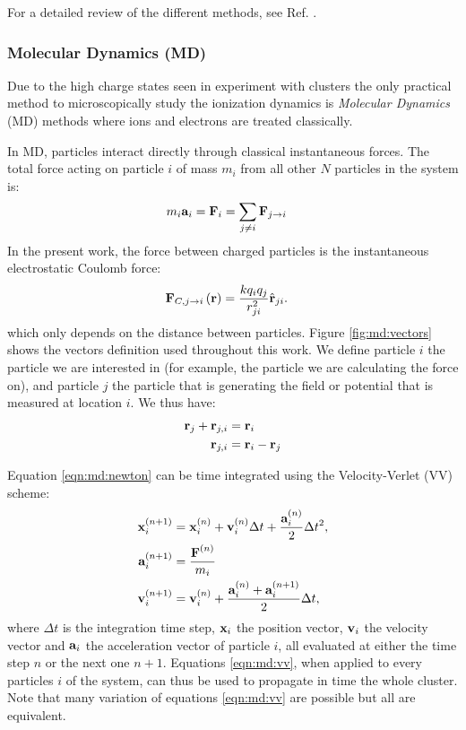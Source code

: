 For a detailed review of the different methods, see Ref. \cite{Fennel2010}.



\subsubsection{Molecular Dynamics (MD)}
Due to the high charge states seen in experiment with clusters the only
practical method to microscopically study the ionization dynamics is
\textit{Molecular Dynamics} (MD) methods where ions and electrons are treated
classically.

In MD, particles interact directly through classical instantaneous forces. The
total force acting on particle $i$ of mass $m_i$ from all other $N$ particles in
the system is:
\begin{align}
m_i \textbf{a}_i & = \textbf{F}_i = \sum_{j \ne i} \textbf{F}_{j \rightarrow i}
\label{eqn:md:newton}
\end{align}
In the present work, the force between charged particles is the instantaneous
electrostatic Coulomb force:
\begin{align}
\textbf{F}_{C,j \rightarrow i}\left( \textbf{r} \right) & =\frac{k q_i q_j}{r_{ji}^2} \hat{\textbf{r}}_{ji}.
\label{eqn:md:coulomb:F}
\end{align}
which only depends on the distance between particles. Figure
\ref{fig:md:vectors} shows the vectors definition used throughout this work. We
define particle $i$ the particle we are interested in (for example, the
particle we are calculating the force on), and particle $j$ the particle that
is generating the field or potential that is measured at location $i$. We thus
have:
\begin{align}
\textbf{r}_{j} + \textbf{r}_{j,i} & = \textbf{r}_{i} \\
\textbf{r}_{j,i} & = \textbf{r}_{i} - \textbf{r}_{j}
\end{align}



Equation \eqref{eqn:md:newton} can be time integrated using the
Velocity-Verlet (VV) scheme:
\begin{subequations}
\begin{align}
\textbf{x}_{i}^{\left( n+1 \right)} & = \textbf{x}_{i}^{\left( n \right)} + \textbf{v}_{i}^{\left( n \right)} \Delta t +
\frac{\textbf{a}_{i}^{\left( n \right)}}{2} \Delta t^2, \\
\textbf{a}_{i}^{\left( n+1 \right)} & = \frac{\textbf{F}^{\left( n \right)}}{m_i} \label{eqn:md:vv:a} \\
\textbf{v}_{i}^{\left( n+1 \right)} & = \textbf{v}_{i}^{\left( n \right)} + \frac{\textbf{a}_{i}^{\left( n \right)} +
\textbf{a}_{i}^{\left( n+1 \right)}}{2} \Delta t,
\end{align}
\label{eqn:md:vv}
\end{subequations}
where $\Delta t$ is the integration time step, $\textbf{x}_{i}$ the position vector,
$\textbf{v}_{i}$ the velocity vector and $\textbf{a}_{i}$ the acceleration vector of
particle $i$, all evaluated at either the time step $n$ or the next one $n+1$.
Equations \eqref{eqn:md:vv}, when applied to every particles $i$ of the system,
can thus be used to propagate in time the whole cluster. Note that many
variation of equations \eqref{eqn:md:vv} are possible but all are equivalent.

